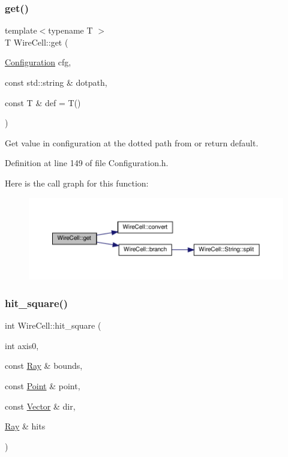 \subsubsection{\texorpdfstring{get()}{get()}}
{\footnotesize\ttfamily template$<$typename T $>$ \\
T Wire\+Cell\+::get (\begin{DoxyParamCaption}\item[{\hyperlink{namespace_wire_cell_a9f705541fc1d46c608b3d32c182333ee}{Configuration}}]{cfg,  }\item[{const std\+::string \&}]{dotpath,  }\item[{const T \&}]{def = {\ttfamily T()} }\end{DoxyParamCaption})}



Get value in configuration at the dotted path from or return default. 



Definition at line 149 of file Configuration.\+h.

Here is the call graph for this function\+:
\nopagebreak
\begin{figure}[H]
\begin{center}
\leavevmode
\includegraphics[width=350pt]{namespace_wire_cell_addd60cc21dab98058698afa8222239bc_cgraph}
\end{center}
\end{figure}
\mbox{\label{namespace_wire_cell_afb58116c2d5bbe14b5e798ca39caaa48}} 
\subsubsection{\texorpdfstring{hit\+\_\+square()}{hit\_square()}}
{\footnotesize\ttfamily int Wire\+Cell\+::hit\+\_\+square (\begin{DoxyParamCaption}\item[{int}]{axis0,  }\item[{const \hyperlink{namespace_wire_cell_a3ab20d9b438feb7eb1ffaab9ba98af0c}{Ray} \&}]{bounds,  }\item[{const \hyperlink{namespace_wire_cell_ab2b2565fa6432efbb4513c14c988cda9}{Point} \&}]{point,  }\item[{const \hyperlink{namespace_wire_cell_aa3c82d3ba85f032b0d278b7004846800}{Vector} \&}]{dir,  }\item[{\hyperlink{namespace_wire_cell_a3ab20d9b438feb7eb1ffaab9ba98af0c}{Ray} \&}]{hits }\end{DoxyParamCaption})}

